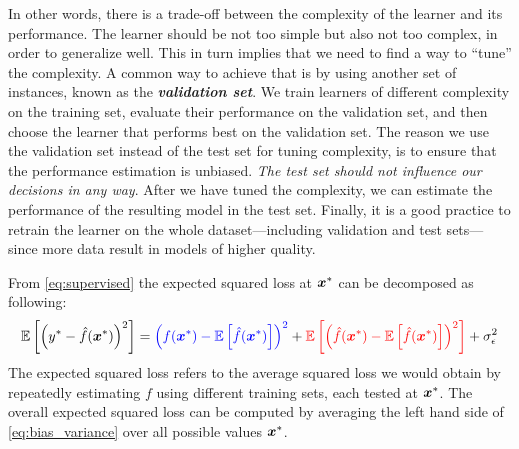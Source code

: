 In other words, there is a trade-off between the complexity of the learner and
its performance. The learner should be not too simple but also not too complex,
in order to generalize well. This in turn implies that we need to find a way to
``tune'' the complexity. A common way to achieve that is by using another set of
instances, known as the \emph{\textbf{validation set}}. We
train learners of different complexity on the training set,
evaluate their performance on the validation set, and then choose the learner
that performs best on the validation set. The reason we use the validation set
instead of the test set for tuning complexity, is to ensure that the performance
estimation is unbiased. \emph{The test set should not influence
our decisions in any way}. After we have tuned the complexity, we can estimate
the performance of the resulting model in the test set. Finally, it is a good
practice to retrain the learner on the whole dataset---including validation and
test sets---since more data result in models of higher quality.

\begin{theorem}
	\label{thrm:bias_variance}
    From \Equation{} \ref{eq:supervised} the expected squared loss at $\boldsymbol{x}^*$ can be decomposed as
    following:
	\begin{equation}
		\label{eq:bias_variance}
		\mathbb{E}\left[\left(y^* - \hat{f}(\boldsymbol{x}^*)\right)^2\right]
		=
		\color{blue}\left(f(\boldsymbol{x}^*) - \mathbb{E}\left[\hat{f}(\boldsymbol{x}^*)\right]\right)^2
		\color{black}
		+
		\color{red}\mathbb{E}\left[\left(\hat{f}(\boldsymbol{x}^*) - \mathbb{E}\left[\hat{f}(\boldsymbol{x}^*)\right]\right)^2\right]
		\color{black}
		+
		\sigma_{\epsilon}^{2}
	\end{equation}
	The expected squared loss refers to the average squared loss we would obtain
	by repeatedly estimating $f$ using different training sets, each tested at
	$\boldsymbol{x}^*$. The overall expected squared loss can be computed by averaging the
	left hand side of \Equation{} \ref{eq:bias_variance} over all possible values
	$\boldsymbol{x}^*$.
\end{theorem}

